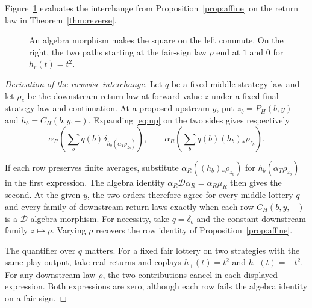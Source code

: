 \documentclass[11pt,a4paper]{article}
\theoremstyle{definition}
\newcommand{\D}{\mathcal D}
\begin{document}
Figure~\ref{fig:affine} evaluates the interchange from Proposition~\ref{prop:affine} on the return law in Theorem~\ref{thm:reverse}.

\begin{figure}[!htbp]
    \centering\small
    \hspace{10mm}%
    \caption{An algebra morphism makes the square on the left commute. On the right, the two paths starting at the fair-sign law $\rho$ end at $1$ and $0$ for $h_r(t)=t^2$.}\label{fig:affine}
\end{figure}

\begin{proof}[Derivation of the rowwise interchange]
    Let $q$ be a fixed middle strategy law and let $\rho_z$ be the downstream return law at forward value $z$ under a fixed final strategy law and continuation. At a proposed upstream $y$, put $z_b=P_H(b,y)$ and $h_b=C_H(b,y,-)$. Expanding \eqref{eq:up} on the two sides gives respectively
    \[
        \alpha_R\!\left(\sum_b q(b)\delta_{h_b(\alpha_T\rho_{z_b})}\right),
        \qquad
        \alpha_R\!\left(\sum_b q(b)(h_b)_*\rho_{z_b}\right).
    \]

    If each row preserves finite averages, substitute $\alpha_R((h_b)_*\rho_{z_b})$ for $h_b(\alpha_T\rho_{z_b})$ in the first expression. The algebra identity $\alpha_R\D\alpha_R=\alpha_R\mu_R$ then gives the second. At the given $y$, the two orders therefore agree for every middle lottery $q$ and every family of downstream return laws exactly when each row $C_H(b,y,-)$ is a $\D$-algebra morphism. For necessity, take $q=\delta_b$ and the constant downstream family $z\mapsto\rho$. Varying $\rho$ recovers the row identity of Proposition~\ref{prop:affine}.

    The quantifier over $q$ matters. For a fixed fair lottery on two strategies with the same play output, take real returns and coplays $h_+(t)=t^2$ and $h_-(t)=-t^2$. For any downstream law $\rho$, the two contributions cancel in each displayed expression. Both expressions are zero, although each row fails the algebra identity on a fair sign.
\end{proof}
\end{document}
